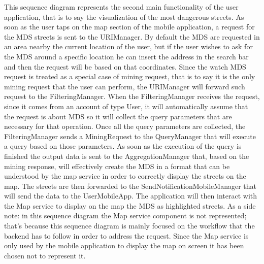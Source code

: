 This sequence diagram represents the second main functionality of the user application, that is to say the visualization of the most dangerous streets. As soon as the user taps on the map section of the mobile application, a request for the MDS streets is sent to the URIManager. By default the MDS are requested in an area nearby the current location of the user, but if the user wishes to ask for the MDS around a specific location he can insert the address in the search bar and then the request will be based on that coordinates. Since the watch MDS request is treated as a special case of mining request, that is to say it is the only mining request that the user can perform, the URIManager will forward such request to the FilteringManager. When the FilteringManager receives the request, since it comes from an account of type User, it will automatically assume that the request is about MDS so it will collect the query parameters that are necessary for that operation.  Once all the query parameters are collected, the FilteringManager sends a MiningRequest to the QueryManager that will execute a query based on those parameters. As soon as the execution of the query is finished the output data is sent to the AggregationManager that, based on the mining response, will effectively create the MDS in a format that can be understood by the map service in order to correctly display the streets on the map. The streets are then forwarded to the SendNotificationMobileManager that will send the data to the UserMobileApp. The application will then interact with the Map service to display on the map the MDS as highlighted streets. As a side note: in this sequence diagram the Map service component is not represented; that's because this sequence diagram is mainly focused on the workflow that the backend has to follow in order to address the request. Since the Map service is only used by the mobile application to display the map on screen it has been chosen not to represent it.
